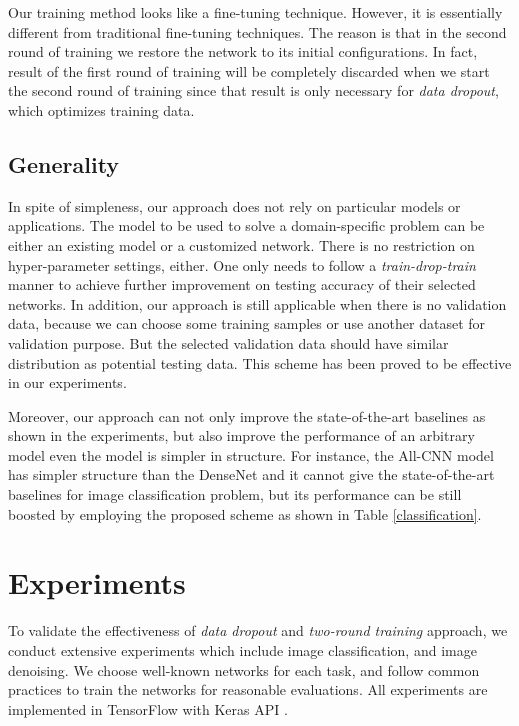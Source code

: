 \documentclass[10pt, conference, letterpaper]{IEEEtran}
\begin{document}
Our training method looks like a fine-tuning technique. However, it is essentially different from traditional fine-tuning techniques. The reason is that in the second round of training we restore the network to its initial configurations. In fact, result of the first round of training will be completely discarded when we start the second round of training since that result is only necessary for \emph{data dropout}, which optimizes training data.

\subsection{Generality}
In spite of simpleness, our approach does not rely on particular models or applications. The model to be used to solve a domain-specific problem can be either an existing model or a customized network. There is no restriction on hyper-parameter settings, either. One only needs to follow a \emph{train-drop-train} manner to achieve further improvement on testing accuracy of their selected networks.
In addition, our approach is still applicable when there is no validation data, because we can choose some training samples or use another dataset for validation purpose. But the selected validation data should have similar distribution as potential testing data. This scheme has been proved to be effective in our experiments. 

Moreover, our approach can not only improve the state-of-the-art baselines as shown in the experiments, but also improve the performance of an arbitrary model even the model is simpler in structure. For instance, the All-CNN model \cite{springenberg2014striving} has simpler structure than the DenseNet \cite{huang2017densely} and it cannot give the state-of-the-art baselines for image classification problem, but its performance can be still boosted by employing the proposed scheme as shown in Table \ref{classification}.


\section{Experiments}
\label{experiment}

To validate the effectiveness of \emph{data dropout} and \emph{two-round training} approach, we conduct extensive experiments which include image classification, and image denoising. We choose well-known networks for each task, and follow common practices to train the networks for reasonable evaluations. All experiments are implemented in TensorFlow \cite{tensorflow2015-whitepaper} with Keras API \cite{chollet2015keras}.
\end{document}
